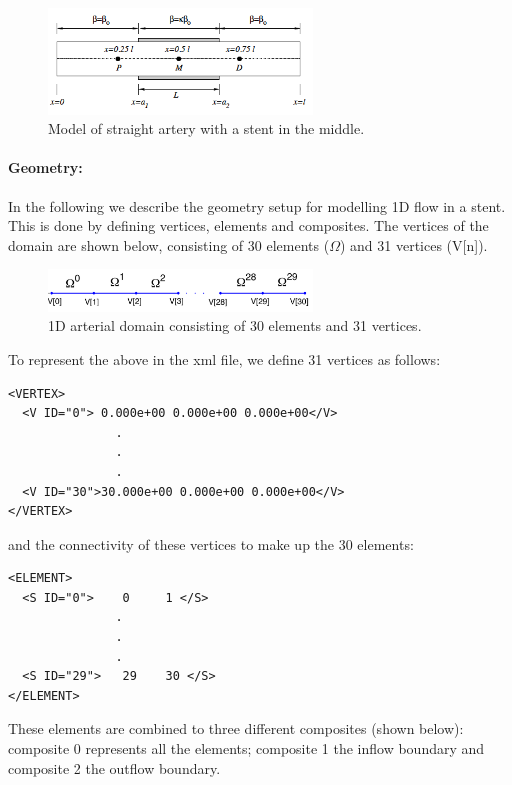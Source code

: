 \begin{figure}
\begin{center}
\includegraphics[width=7cm]{img/StentGeometry.png}
\caption{Model of straight artery with a stent in the middle.}
\end{center}
\end{figure}

\paragraph{Geometry:~} In the following we describe the geometry setup for modelling 1D flow in a stent. This is done by defining vertices, elements and composites. The vertices of the domain are shown below, consisting of 30 elements ($\Omega$) and 31 vertices (V[n]).

\begin{figure}
\begin{center}
\includegraphics[width=7cm]{img/StentDomain.png}
\caption{1D arterial domain consisting of 30 elements and 31 vertices.}
\end{center}
\end{figure}

To represent the above in the xml file, we define 31 vertices as follows:
\begin{lstlisting}[style=XMLStyle]
<VERTEX>
  <V ID="0"> 0.000e+00 0.000e+00 0.000e+00</V>
               .
               .
               . 
  <V ID="30">30.000e+00 0.000e+00 0.000e+00</V>
</VERTEX>
\end{lstlisting}
and the connectivity of these vertices to make up the 30 elements:
\begin{lstlisting}[style=XMLStyle]
<ELEMENT>
  <S ID="0">    0     1 </S>
               .
               .
               . 
  <S ID="29">   29    30 </S>
</ELEMENT>
\end{lstlisting}

These elements are combined to three different composites (shown below): composite 0 represents all the elements; composite 1 the inflow boundary and composite 2 the outflow boundary.
 

